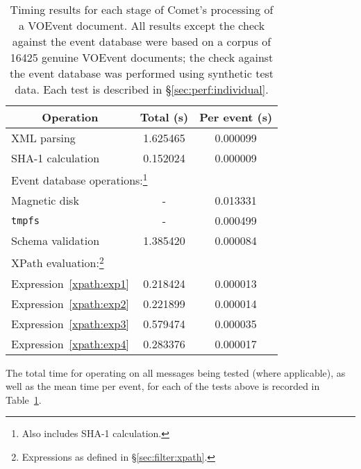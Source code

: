 \documentclass[5p,authoryear]{elsarticle}
\begin{document}
\begin{table}
\renewcommand*\footnoterule{}
\begin{minipage}{\columnwidth} %
\begin{center}

\caption{Timing results for each stage of Comet's processing of a VOEvent
document. All results except the check against the event database were based
on a corpus of 16425 genuine VOEvent documents; the check against the event
database was performed using synthetic test data. Each test is described in
\S\ref{sec:perf:individual}.}
\label{tab:perf:individual}
\begin{tabular}{lcc}
\toprule
\multicolumn{1}{c}{Operation} & \multicolumn{1}{c}{Total (s)} &\multicolumn{1}{c}{Per event (s)} \\
\midrule
XML parsing & 1.625465 & 0.000099 \\
SHA-1 calculation & 0.152024 & 0.000009 \\
\multicolumn{3}{l}{Event database operations:\footnote{Also includes SHA-1 calculation.}} \\
\hspace{4mm} Magnetic disk  & - & 0.013331 \\
\hspace{4mm} \texttt{tmpfs} & - & 0.000499 \\
Schema validation & 1.385420 & 0.000084 \\
\multicolumn{3}{l}{XPath evaluation:\footnote{Expressions as defined in \S\ref{sec:filter:xpath}.}} \\
\hspace{4mm}  Expression~\ref{xpath:exp1} & 0.218424 & 0.000013 \\
\hspace{4mm}  Expression~\ref{xpath:exp2} & 0.221899 & 0.000014 \\
\hspace{4mm}  Expression~\ref{xpath:exp3} & 0.579474 & 0.000035 \\
\hspace{4mm}  Expression~\ref{xpath:exp4} & 0.283376 & 0.000017 \\
\bottomrule
\end{tabular}
\end{center}
\end{minipage}
\end{table}

The total time for operating on all messages being tested (where applicable),
as well as the mean time per event, for each of the tests above is recorded in
Table~\ref{tab:perf:individual}.
\end{document}
